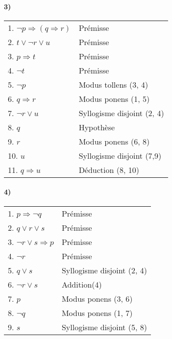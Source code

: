     \paragraph{3)}
    \begin{center}
    \begin{tabular}{|l|l|}
    \hline
    1. $\lnot p \Rightarrow (q \Rightarrow r)$ & Prémisse \\

    2. $t \lor \lnot r \lor u$ & Prémisse \\
    3. $p \Rightarrow t$ & Prémisse \\
    4. $\lnot t$ & Prémisse \\
    5. $\lnot p$ & Modus tollens (3, 4) \\ 
    6. $q \Rightarrow r$ & Modus ponens (1, 5) \\
    7. $\lnot r \lor u$ & Syllogisme disjoint (2, 4) \\
    \hspace{0.5cm} 8. $q$ & Hypothèse \\
    \hspace{0.5cm} 9. $r$ & Modus ponens (6, 8) \\
    \hspace{0.5cm} 10. $u$ & Syllogisme disjoint (7,9) \\
    11. $q \Rightarrow u$ & Déduction (8, 10) \\
    \hline
    \end{tabular}
    \end{center}
    
    \paragraph{4)}
    \begin{center}
    \begin{tabular}{|l|l|}
    \hline
    1. $p \Rightarrow \lnot q$ & Prémisse \\
    2. $q \lor r \lor s$ & Prémisse \\
    3. $\lnot r \lor s \Rightarrow p$ & Prémisse \\
    4. $\lnot r$ & Prémisse \\
    5. $q \lor s$ & Syllogisme disjoint (2, 4) \\
    6. $\lnot r \lor s$ & Addition(4) \\
    7. $p$ & Modus ponens (3, 6) \\
    8. $\lnot q$ & Modus ponens (1, 7) \\
    9. $s$ & Syllogisme disjoint (5, 8) \\
    \hline
    \end{tabular}
    \end{center}
    
